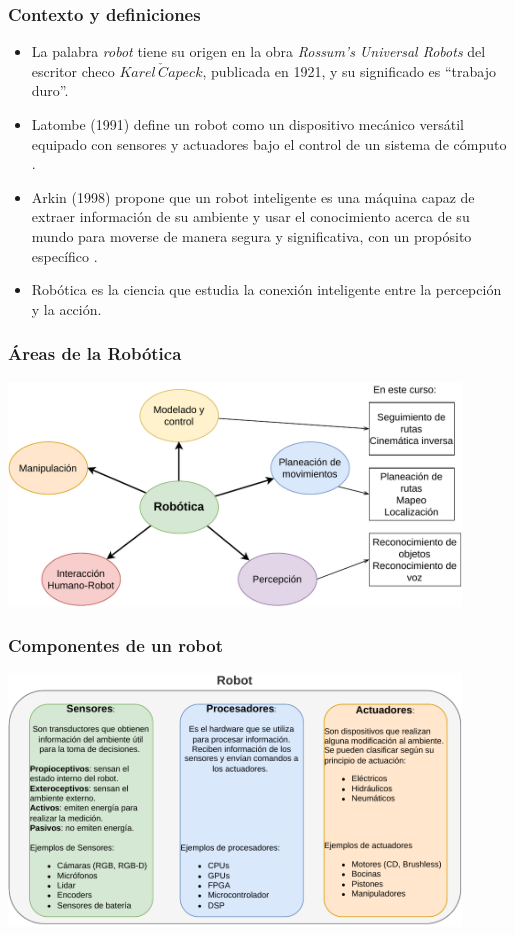 
\begin{frame}\frametitle{Contexto y definiciones}
  \begin{itemize}
  \item La palabra \textit{robot} tiene su origen en la obra \textit{Rossum's Universal Robots} del escritor checo $Karel \,\check{C}apeck$, publicada en 1921, y su significado es ``trabajo duro''.
  \item Latombe (1991) define un robot como un dispositivo mecánico versátil equipado con sensores y actuadores bajo el control de un sistema de cómputo \cite{Latombe1991MotionPlanning}.
  \item Arkin (1998) propone que un robot inteligente es una máquina capaz de extraer información de su ambiente y usar el conocimiento acerca de su mundo para moverse de manera segura y significativa, con un propósito específico \cite{Arkin1998BehBasedRobo}.
  \item Robótica es la ciencia que estudia la conexión inteligente entre la percepción y la acción. 
  \end{itemize}
\end{frame}

\begin{frame}\frametitle{Áreas de la Robótica}
  
  \includegraphics[width=0.9\textwidth]{Figures/RoboticsAreas.pdf}
\end{frame}

\begin{frame}\frametitle{Componentes de un robot}
  \includegraphics[width=0.9\textwidth]{Figures/RobotComponents.pdf}
\end{frame}


